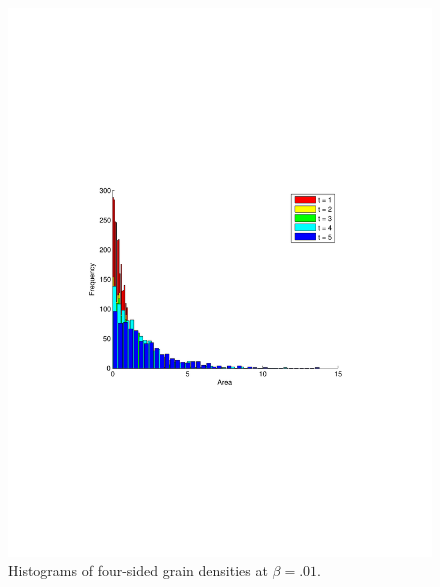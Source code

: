 \begin{figure}
\includegraphics[width=\textwidth]{histbetazerotier4.pdf}
\vspace{-130pt}
\caption{Histograms of four-sided grain densities at $\beta = .01$.}\label{tierdens1}
\end{figure}

